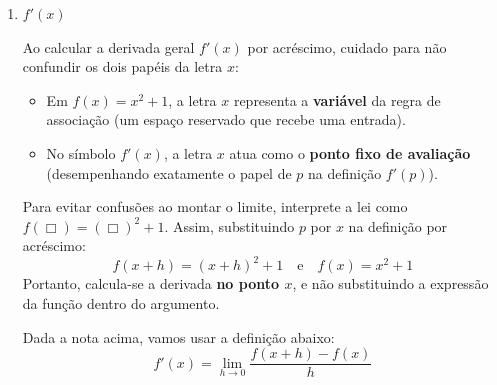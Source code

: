 \begin{enumerate}[label=\alph*)]
    Sendo $f(x) = x^2 + 1$, calculamos o valor da função em $p = 0$:
    \[
    f(0) = 0^2 + 1 = 1
    \]

    Substituindo $f(x)$ e $f(0)$ em \eqref{eq:quociente_ponto0}:
    \begin{align*}
        \frac{f(x) - f(0)}{x - 0} &= \frac{(x^2 + 1) - 1}{x} \\[0.25cm]
        &= \frac{x^2}{x} \\[0.25cm]
        &= x
    \end{align*}

    Daí, aplicando o limite em \eqref{eq:def_derivada_ponto0} quando $x \to 0$:
    \[
    f'(0) = \lim_{x \to 0} \frac{f(x) - f(0)}{x - 0} = \lim_{x \to 0} x = 0
    \]

    Portanto:
    \[
    f'(0) = 0 \qedsymbolmath
    \]

    \item $f'(x)$
    \setcounter{equation}{0}

    \begin{dicasbox}[title={Atenção: A Notação $f'(x)$ e a Mudança de Papel de $x$}]
        Ao calcular a derivada geral $f'(x)$ por acréscimo, cuidado para não confundir os dois papéis da letra $x$:
        \begin{itemize}[noitemsep, topsep=3pt]
            \item Em $f(x) = x^2 + 1$, a letra $x$ representa a \textbf{variável} da regra de associação (um espaço reservado que recebe uma entrada).
            \item No símbolo $f'(x)$, a letra $x$ atua como o \textbf{ponto fixo de avaliação} (desempenhando exatamente o papel de $p$ na definição $f'(p)$).
        \end{itemize}
        \vspace{0.15cm}
        Para evitar confusões ao montar o limite, interprete a lei como $f(\Box) = (\Box)^2 + 1$. Assim, substituindo $p$ por $x$ na definição por acréscimo:
        \[
        f(x + h) = (x + h)^2 + 1 \quad \text{e} \quad f(x) = x^2 + 1
        \]
        Portanto, calcula-se a derivada \textbf{no ponto $x$}, e não substituindo a expressão da função dentro do argumento.
    \end{dicasbox}

    Dada a nota acima, vamos usar a definição abaixo:
    \begin{equation}
        f'(x) = \lim_{h \to 0} \frac{f(x + h) - f(x)}{h} \label{eq:def_derivada}
    \end{equation}


\end{enumerate}
